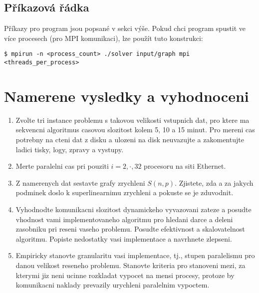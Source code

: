 \documentclass[czech]{article}
\begin{document}
\subsection{Příkazová řádka}
Příkazy pro program jsou popsané v sekci výše. Pokud chci program spustit ve více procesech (pro MPI komunikaci), lze použít tuto konstrukci:
\begin{lstlisting}[tabsize=2]
	$ mpirun -n <process_count> ./solver input/graph mpi <threads_per_process>
\end{lstlisting}

\section{Namerene vysledky a vyhodnoceni}

\begin{enumerate}
\item Zvolte tri instance problemu s takovou velikosti vstupnich dat, pro ktere ma sekvencni 
algoritmus casovou slozitost kolem 5, 10 a 15 minut.
Pro mereni cas potrebny na cteni dat z disku a ulozeni na disk neuvazujte a zakomentujte
ladici tisky, logy, zpravy a vystupy.
\item Merte paralelni cas pri pouziti $i=2,\cdot,32$ procesoru na siti Ethernet.
\item Z namerenych dat sestavte grafy zrychleni $S(n,p)$. Zjistete, zda a za jakych podminek
doslo k superlinearnimu zrychleni a pokuste se je zduvodnit.
\item Vyhodnodte komunikacni slozitost dynamickeho vyvazovani zateze a posudte
vhodnost vami implementovaneho algoritmu pro hledani darce a deleni zasobniku pri reseni vaseho
problemu. Posudte efektivnost a skalovatelnost algoritmu. Popiste nedostatky
vasi implementace a navrhnete zlepseni.
\item Empiricky stanovte 
granularitu vasi implementace, tj., stupen paralelismu pro danou velikost reseneho
problemu. Stanovte kriteria pro stanoveni mezi, za kterymi jiz neni
ucinne rozkladat vypocet na mensi procesy, protoze by komunikacni
naklady prevazily urychleni paralelnim vypoctem.

\end{enumerate}
\end{document}
